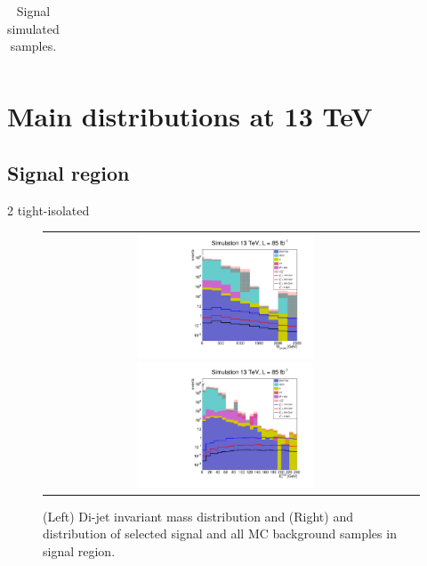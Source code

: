 \begin{table}[ht]
{\begin{tabular}{| l | l |}
			\hline
		\end{tabular}
	}
	\caption{Signal simulated samples.}
	\label{table:samples_signal_13tev} %
\end{table}

\clearpage

\section{Main distributions at 13 TeV}



\subsection*{Signal region}

\FloatBarrier

2 tight-isolated \hadtau

\begin{figure}[tbh!]
	\centering
	\begin{tabular}{cc}
		\includegraphics[width=0.5\textwidth]{analysis/pics/h_dijetinvariantmass_Taui2TightIso.pdf}
		\includegraphics[width=0.5\textwidth]{analysis/pics/h_met_Taui2TightIso.pdf}
	\end{tabular}
	\caption{(Left) Di-jet invariant mass distribution and (Right) and \met distribution of selected signal and all MC background samples in signal region.}
	\label{fig::crplots1_Taui2TightIso_13tev}
\end{figure}

